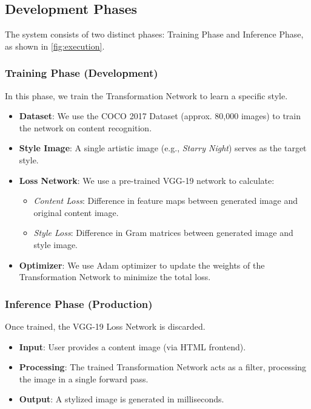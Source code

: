 \documentclass[a4paper,12pt]{article}
\begin{document}
\subsection{Development Phases}

The system consists of two distinct phases: Training Phase and Inference Phase,
as shown in \cref{fig:execution}.

\subsubsection{Training Phase (Development)}
In this phase, we train the Transformation Network to learn a specific style.
\begin{itemize}
    \item \textbf{Dataset}: We use the COCO 2017 Dataset (approx. 80,000 images) to train the network on content recognition.
    \item \textbf{Style Image}: A single artistic image (e.g., \textit{Starry Night}) serves as the target style.
    \item \textbf{Loss Network}: We use a pre-trained VGG-19 network to calculate:
    \begin{itemize}
        \item \emph{Content Loss}: Difference in feature maps between generated image and original content image.
        \item \emph{Style Loss}: Difference in Gram matrices between generated image and style image.
    \end{itemize}
    \item \textbf{Optimizer}: We use Adam optimizer to update the weights of the Transformation Network to minimize the total loss.
\end{itemize}

\subsubsection{Inference Phase (Production)}
Once trained, the VGG-19 Loss Network is discarded. 
\begin{itemize}
    \item \textbf{Input}: User provides a content image (via HTML frontend).
    \item \textbf{Processing}: The trained Transformation Network acts as a filter, processing the image in a single forward pass.
    \item \textbf{Output}: A stylized image is generated in milliseconds.
\end{itemize}
\end{document}
